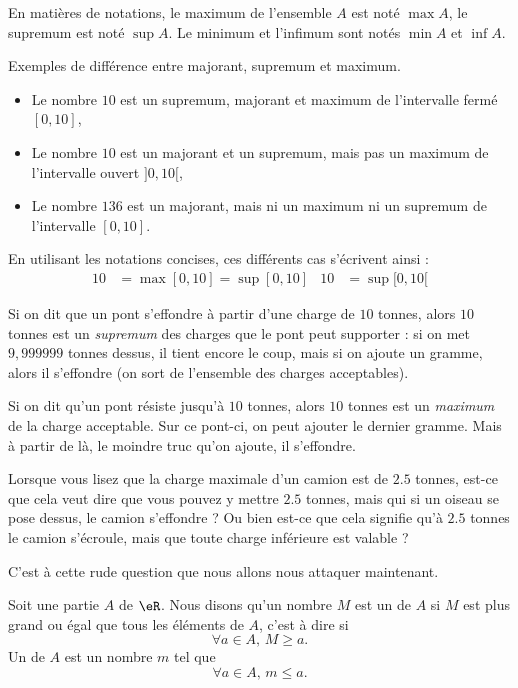 En matières de notations, le maximum de l'ensemble $A$ est noté $\max A$, le supremum est noté $\sup A$. Le minimum et l'infimum sont notés $\min A$ et $\inf A$.

\begin{example}
Exemples de différence entre majorant, supremum et maximum.
\begin{itemize}
\item Le nombre $10$ est un supremum, majorant et maximum de l'intervalle fermé $[0,10]$,
\item Le nombre $10$ est un majorant et un supremum, mais pas un maximum de l'intervalle ouvert $]0,10[$,
\item Le nombre $136$ est un majorant, mais ni un maximum ni un supremum de l'intervalle $[0,10]$.
\end{itemize}
\end{example}

En utilisant les notations concises, ces différents cas s'écrivent ainsi :
\begin{align*}
10&=\max[0,10]=\sup[0,10]	& 10&=\sup[0,10[
\end{align*}


\begin{example}
Si on dit que un pont s'effondre à partir d'une charge de $10$ tonnes, alors $10$ tonnes est un \emph{supremum} des charges que le pont peut supporter : si on met $9,999999$ tonnes dessus, il tient encore le coup, mais si on ajoute un gramme, alors il s'effondre (on sort de l'ensemble des charges acceptables).
\end{example}

\begin{example}
Si on dit qu'un pont résiste jusqu'à $10$ tonnes, alors $10$ tonnes est un \emph{maximum} de la charge acceptable. Sur ce pont-ci, on peut ajouter le dernier gramme. Mais à partir de là, le moindre truc qu'on ajoute, il s'effondre.
\end{example}

Lorsque vous lisez que la charge maximale d'un camion est de \(2.5 \) tonnes, est-ce que cela veut dire que vous pouvez y mettre \( 2.5\) tonnes, mais qui si un oiseau se pose dessus, le camion s'effondre ? Ou bien est-ce que cela signifie qu'à \( 2.5\) tonnes le camion s'écroule, mais que toute charge inférieure est valable ?

C'est à cette rude question que nous allons nous attaquer maintenant.

\begin{definition}
Soit une partie $A$ de $\eR$. Nous disons qu'un nombre $M$ est un  de $A$ si $M$ est plus grand ou égal que tous les éléments de $A$, c'est à dire si
\begin{equation}
	\forall a\in A,\, M\geq a.
\end{equation}
Un  de $A$ est un nombre $m$ tel que 
\begin{equation}
	\forall a\in A,\, m\leq a.
\end{equation}
\end{definition}

